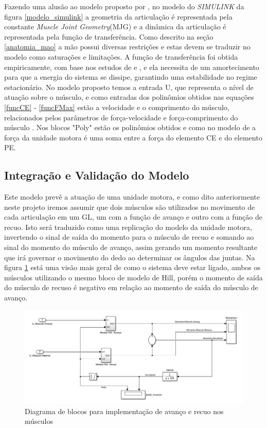 Fazendo uma alusão ao modelo proposto por \cite{feng1999surface}, no modelo do \textit{SIMULINK} da figura \ref{modelo_simulink} a geometria da articulação é representada pela constante \textit{Muscle Joint Geometry}(MJG) e a dinâmica da articulação é representada pela função de transferência. Como descrito na seção \ref{anatomia_mao} a mão possui diversas restrições e estas devem se traduzir no modelo como saturações e limitações. A função de transferência foi obtida empiricamente, com base nos estudos de \cite{zajac1989muscle} e \cite{rosen1999performances}, e ela necessita de um amortecimento para que a energia do sistema se dissipe, garantindo uma estabilidade no regime estacionário. No modelo proposto temos a entrada U, que representa o nível de atuação sobre o músculo, e como entradas dos polinômios obtidos nas equações \ref{funcCE} - \ref{funcFMax} estão a velocidade e o comprimento do músculo, relacionados pelos parâmetros de força-velocidade e força-comprimento do músculo \cite{zajac1989muscle}. Nos blocos "Poly" estão os polinômios obtidos e como no modelo de \cite{durfee1994estimation} a força da unidade motora é uma soma entre a força do elemento CE e do elemento PE.

\subsection{Integração e Validação do Modelo}

Este modelo prevê a atuação de uma unidade motora, e como dito anteriormente neste projeto iremos assumir que dois músculos são utilizados no movimento de cada articulação em um GL, um com a função de avanço e outro com a função de recuo. Isto será traduzido como uma replicação do modelo da unidade motora, invertendo o sinal de saída do momento para o músculo de recuo e somando ao sinal do momento do músculo de avanço, assim gerando um momento resultante que irá governar o movimento do dedo ao determinar os ângulos das juntas. Na figura \ref{modelo_simulink_macro} está uma visão mais geral de como o sistema deve estar ligado, ambos os músculos utilizando o mesmo bloco de modelo de Hill, porém o momento de saída do músculo de recuso é negativo em relação ao momento de saída do músculo de avanço.

\begin{figure}[H]
\centering
\includegraphics[width = 1\textwidth]{img/Modelo_2Unidades.JPG}
\caption[Modelo de Avanço e Recuo - Simulink]{Diagrama de blocos para implementação de avanço e recuo nos músculos}
\label{modelo_simulink_macro}
\end{figure}

